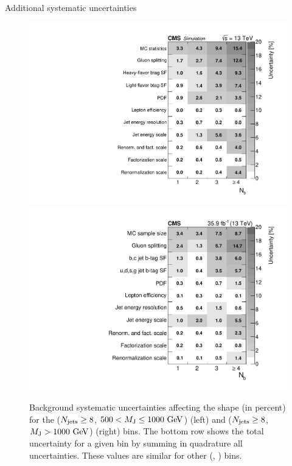 \begin{section}{Additional systematic uncertainties}
\begin{figure}[tbp!]
\begin{center}
\includegraphics[angle=0,width=0.45\columnwidth]{fig/table_bkg_systs_bin20.pdf}
\includegraphics[angle=0,width=0.45\columnwidth]{fig/table_bkg_systs_bin21.pdf}
\end{center}
\caption{Background systematic uncertainties affecting the \Nb shape (in percent) for the ($N_{\mathrm{jets}} \geq 8$, $500 < M_{\mathrm{J}} \leq 1000~\mathrm{Ge\kern -0.1em V}$) (left) and ($N_{\mathrm{jets}} \geq 8$, $M_{\mathrm{J}} > 1000~\mathrm{Ge\kern -0.1em V}$) (right) bins.
The bottom row shows the total uncertainty for a given \Nb bin by summing in quadrature all uncertainties.
These values are similar for other (\Njets, \MJ) bins.}
\label{fig:bkg_sys_tables}
\end{figure}

\end{section}

